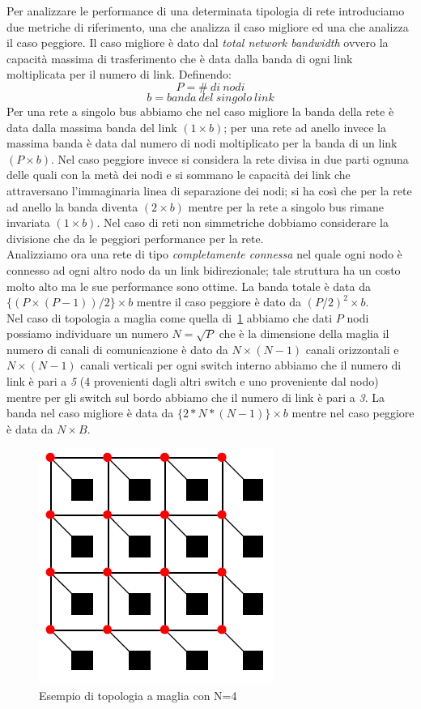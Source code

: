 Per analizzare le performance di una determinata tipologia di rete introduciamo due metriche di riferimento, una che analizza il caso migliore ed una che analizza il caso peggiore. Il caso migliore è dato dal \emph{total network bandwidth} ovvero la capacità massima di trasferimento che è data dalla banda di ogni link moltiplicata per il numero di link. Definendo:
$$P = \# \ di \ nodi$$
$$b = banda \ del \ singolo \ link$$
Per una rete a singolo bus abbiamo che nel caso migliore la banda della rete è data dalla massima banda del link $(1 \times b)$; per una rete ad anello invece la massima banda è data dal numero di nodi moltiplicato per la banda di un link $(P \times b)$.
Nel caso peggiore invece si considera la rete divisa in due parti ognuna delle quali con la metà dei nodi e si sommano le capacità dei link che attraversano l'immaginaria linea di separazione dei nodi; si ha così che per la rete ad anello la banda diventa $(2 \times b)$ mentre per la rete a singolo bus rimane invariata $(1 \times b)$. Nel caso di reti non simmetriche dobbiamo considerare la divisione che da le peggiori performance per la rete.\\
Analizziamo ora una rete di tipo \emph{completamente connessa} nel quale ogni nodo è connesso ad ogni altro nodo da un link bidirezionale; tale struttura ha un costo molto alto ma le sue performance sono ottime. La banda totale è data da $\{(P \times (P-1))/2\}\times b$ mentre il caso peggiore è dato da $(P/2)^2 \times b$.\\
Nel caso di topologia a maglia come quella di \figurename\,\ref{fig:mesh} abbiamo che dati $P$ nodi possiamo individuare un numero $N = \sqrt{P}$ che è la dimensione della maglia il numero di canali di comunicazione è dato da $N \times (N-1)$ canali orizzontali e $N \times (N-1)$ canali verticali per ogni switch interno abbiamo che il numero di link è pari a \emph{5} (4 provenienti dagli altri switch e uno proveniente dal nodo) mentre per gli switch sul bordo abbiamo che il numero di link è pari a \emph{3}. La banda nel caso migliore è data da $\{2 * N * (N-1)\}\times b$ mentre nel caso peggiore è data da $N \times B$.\\
\begin{figure}[htb]
\centering
\includegraphics[scale=0.5]{img/mesh.png}
\caption{Esempio di topologia a maglia con N=4}\label{fig:mesh}
\end{figure}
